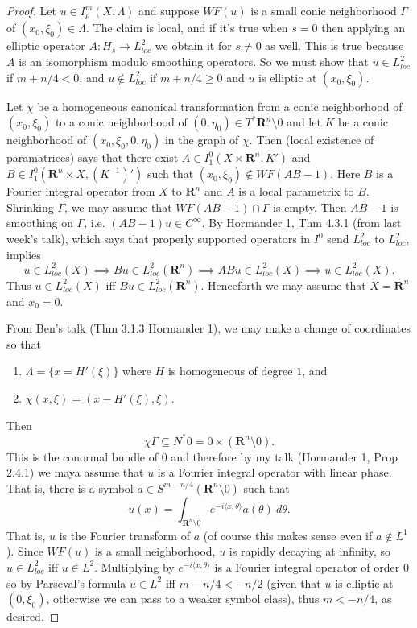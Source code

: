 \documentclass[reqno,12pt,letterpaper]{amsart}
\newcommand{\RR}{\mathbf{R}}
\theoremstyle{definition}
\begin{document}
\begin{proof}
Let $u \in I^m_\rho(X, \Lambda)$ and suppose $WF(u)$ is a small conic neighborhood $\Gamma$ of $(x_0, \xi_0) \in \Lambda$.
The claim is local, and if it's true when $s = 0$ then applying an elliptic operator $A: H_s \to L^2_{loc}$ we obtain it for $s \neq 0$ as well.
This is true because $A$ is an isomorphism modulo smoothing operators.
So we must show that $u \in L^2_{loc}$ if $m + n/4 < 0$, and $u \notin L^2_{loc}$ if $m + n/4 \geq 0$ and $u$ is elliptic at $(x_0, \xi_0)$.

Let $\chi$ be a homogeneous canonical transformation from a conic neighborhood of $(x_0, \xi_0)$ to a conic neighborhood of $(0, \eta_0) \in T^* \RR^n \setminus 0$ and let $K$ be a conic neighborhood of $(x_0, \xi_0, 0, \eta_0)$ in the graph of $\chi$.
Then (local existence of paramatrices) says that there exist $A \in I^0_1(X \times \RR^n, K')$ and $B \in I^0_1(\RR^n \times X, (K^{-1})')$ such that $(x_0, \xi_0) \notin WF(AB - 1)$.
Here $B$ is a Fourier integral operator from $X$ to $\RR^n$ and $A$ is a local parametrix to $B$.
Shrinking $\Gamma$, we may assume that $WF(AB - 1) \cap \Gamma$ is empty.
Then $AB - 1$ is smoothing on $\Gamma$, i.e. $(AB - 1)u \in C^\infty$.
By Hormander 1, Thm 4.3.1 (from last week's talk), which says that properly supported operators in $I^0$ send $L^2_{loc}$ to $L^2_{loc}$, implies
$$u \in L^2_{loc}(X) \implies Bu \in L^2_{loc}(\RR^n) \implies ABu \in L^2_{loc}(X) \implies u \in L^2_{loc}(X).$$
Thus $u \in L^2_{loc}(X)$ iff $Bu \in L^2_{loc}(\RR^n)$.
Henceforth we may assume that $X = \RR^n$ and $x_0 = 0$.

From Ben's talk (Thm 3.1.3 Hormander 1), we may make a change of coordinates so that
\begin{enumerate}
\item $\Lambda = \{x = H'(\xi)\}$ where $H$ is homogeneous of degree $1$, and
\item $\chi(x, \xi) = (x - H'(\xi), \xi)$.
\end{enumerate}
Then
$$\chi \Gamma \subseteq N^* 0 = 0 \times (\RR^n \setminus 0).$$
This is the conormal bundle of $0$ and therefore by my talk (Hormander 1, Prop 2.4.1) we maya assume that $u$ is a Fourier integral operator with linear phase.
That is, there is a symbol $a \in S^{m - n/4}(\RR^n \setminus 0)$ such that
$$u(x) = \int_{\RR^n \setminus 0} e^{-i\langle x, \theta\rangle} a(\theta) ~d\theta.$$
That is, $u$ is the Fourier transform of $a$ (of course this makes sense even if $a \notin L^1$).
Since $WF(u)$ is a small neighborhood, $u$ is rapidly decaying at infinity, so $u \in L^2_{loc}$ iff $u \in L^2$.
Multiplying by $e^{-i\langle x,\theta\rangle}$ is a Fourier integral operator of order $0$ so by Parseval's formula $u \in L^2$ iff $m - n/4 < -n/2$ (given that $u$ is elliptic at $(0, \xi_0)$, otherwise we can pass to a weaker symbol class), thus $m < -n/4$, as desired.
\end{proof}
\end{document}
